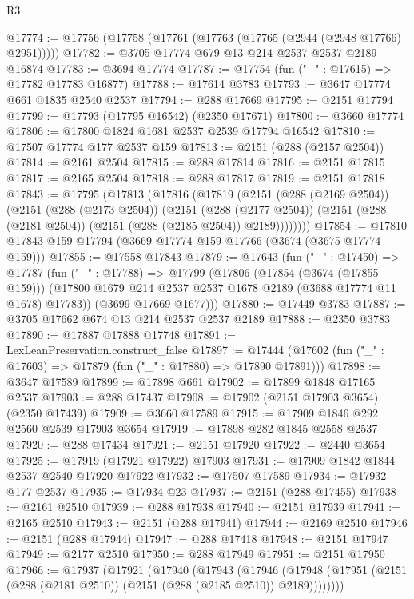 \begin{lexlean}{R3}
\begin{coremodule}
@17774 := @17756 (@17758 (@17761 (@17763 (@17765 (@2944 (@2948 @17766) @2951)))))
@17782 := @3705 @17774 @679 @13 @214 @2537 @2537 @2189 @16874
@17783 := @3694 @17774
@17787 := @17754 (fun ("_" : @17615) => @17782 @17783 @16877)
@17788 := @17614 @3783
@17793 := @3647 @17774 @661 @1835 @2540 @2537
@17794 := @288 @17669
@17795 := @2151 @17794
@17799 := @17793 (@17795 @16542) (@2350 @17671)
@17800 := @3660 @17774
@17806 := @17800 @1824 @1681 @2537 @2539 @17794 @16542
@17810 := @17507 @17774 @177 @2537 @159
@17813 := @2151 (@288 (@2157 @2504))
@17814 := @2161 @2504
@17815 := @288 @17814
@17816 := @2151 @17815
@17817 := @2165 @2504
@17818 := @288 @17817
@17819 := @2151 @17818
@17843 := @17795
    (@17813
      (@17816
        (@17819
          (@2151
            (@288 (@2169 @2504))
            (@2151
              (@288 (@2173 @2504))
              (@2151
                (@288 (@2177 @2504))
                (@2151 (@288 (@2181 @2504)) (@2151 (@288 (@2185 @2504)) @2189))))))))
@17854 := @17810 @17843 @159 @17794 (@3669 @17774 @159 @17766 (@3674 (@3675 @17774 @159)))
@17855 := @17558 @17843
@17879 := @17643
    (fun ("_" : @17450) =>
    @17787
      (fun ("_" : @17788) =>
      @17799
        (@17806
          (@17854 (@3674 (@17855 @159)))
          (@17800 @1679 @214 @2537 @2537 @1678 @2189 (@3688 @17774 @11 @1678) @17783))
        (@3699 @17669 @1677)))
@17880 := @17449 @3783
@17887 := @3705 @17662 @674 @13 @214 @2537 @2537 @2189
@17888 := @2350 @3783
@17890 := @17887 @17888 @17748
@17891 := LexLeanPreservation.construct_false
@17897 := @17444 (@17602 (fun ("_" : @17603) => @17879 (fun ("_" : @17880) => @17890 @17891)))
@17898 := @3647 @17589
@17899 := @17898 @661
@17902 := @17899 @1848 @17165 @2537
@17903 := @288 @17437
@17908 := @17902 (@2151 @17903 @3654) (@2350 @17439)
@17909 := @3660 @17589
@17915 := @17909 @1846 @292 @2560 @2539 @17903 @3654
@17919 := @17898 @282 @1845 @2558 @2537
@17920 := @288 @17434
@17921 := @2151 @17920
@17922 := @2440 @3654
@17925 := @17919 (@17921 @17922) @17903
@17931 := @17909 @1842 @1844 @2537 @2540 @17920 @17922
@17932 := @17507 @17589
@17934 := @17932 @177 @2537
@17935 := @17934 @23
@17937 := @2151 (@288 @17455)
@17938 := @2161 @2510
@17939 := @288 @17938
@17940 := @2151 @17939
@17941 := @2165 @2510
@17943 := @2151 (@288 @17941)
@17944 := @2169 @2510
@17946 := @2151 (@288 @17944)
@17947 := @288 @17418
@17948 := @2151 @17947
@17949 := @2177 @2510
@17950 := @288 @17949
@17951 := @2151 @17950
@17966 := @17937
    (@17921
      (@17940
        (@17943
          (@17946
            (@17948 (@17951 (@2151 (@288 (@2181 @2510)) (@2151 (@288 (@2185 @2510)) @2189))))))))

\end{coremodule}
\end{lexlean}
